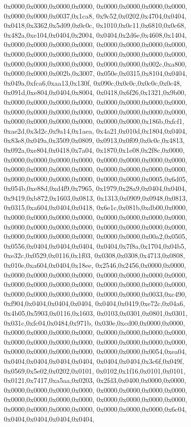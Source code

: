 {	0x0000,0x0000,0x0000,0x0000,
	0x0000,0x0000,0x0000,0x0000,
	0x0000,0x0000,0x0037,0x1ca8,
	0x9c52,0x0202,0x4704,0x0404,
	0x0418,0x3362,0x5d09,0x0c0c,
	0x1010,0x0c11,0x6810,0x0c68,
	0x482a,0xe104,0x0404,0x2004,
	0x0404,0x2d6e,0x4608,0x1404,
	0x0000,0x0000,0x0000,0x0000,
	0x0000,0x0000,0x0000,0x0000,
	0x0000,0x0000,0x0000,0x0000,
	0x0000,0x0000,0x0000,0x0000,
	0x0000,0x0000,0x0000,0x0000,
	0x0000,0x0000,0x002c,0xa800,
	0x0000,0x0000,0x002b,0x3007,
	0x050e,0x0315,0x8104,0x0404,
	0x049a,0xfca6,0xaa13,0x130f,
	0x090c,0x0c0c,0x0c0c,0x0c48,
	0x091d,0xe804,0x0404,0x8004,
	0x0418,0x6f26,0x1321,0x9b00,
	0x0000,0x0000,0x0000,0x0000,
	0x0000,0x0000,0x0000,0x0000,
	0x0000,0x0000,0x0000,0x0000,
	0x0000,0x0000,0x0000,0x0000,
	0x0000,0x0000,0x0000,0x0000,
	0x0000,0x0000,0x186b,0xfcf1,
	0xae2d,0x3d2c,0x9a14,0x1aea,
	0x4a21,0x010d,0x1804,0x0404,
	0x83e8,0x049a,0x3509,0x0809,
	0x0913,0x0f09,0x0c0c,0x4813,
	0x092a,0xe804,0x0418,0x7a04,
	0x1870,0x1e08,0x2f8c,0x0000,
	0x0000,0x0000,0x0000,0x0000,
	0x0000,0x0000,0x0000,0x0000,
	0x0000,0x0000,0x0000,0x0000,
	0x0000,0x0000,0x0000,0x0000,
	0x0000,0x0000,0x0000,0x0000,
	0x0000,0x0000,0x0005,0x6d05,
	0x054b,0xe88d,0xd4f9,0x7965,
	0x1979,0x28a9,0x0404,0x0404,
	0x9419,0xb872,0x1603,0x0813,
	0x1313,0x0909,0x0948,0x0813,
	0x0315,0xa604,0x0404,0x0418,
	0x6e1c,0x081b,0xdb00,0x0000,
	0x0000,0x0000,0x0000,0x0000,
	0x0000,0x0000,0x0000,0x0000,
	0x0000,0x0000,0x0000,0x0000,
	0x0000,0x0000,0x0000,0x0000,
	0x0000,0x0000,0x0000,0x0000,
	0x0000,0x0000,0x00a2,0x0505,
	0x0556,0x0404,0x0404,0x0404,
	0x0404,0x7f8a,0x1704,0x04b5,
	0xe32c,0x0529,0x0116,0x1f03,
	0x0308,0x0308,0x4713,0x0808,
	0x010e,0xa604,0x0404,0x18ee,
	0x2546,0x2456,0x0000,0x0000,
	0x0000,0x0000,0x0000,0x0000,
	0x0000,0x0000,0x0000,0x0000,
	0x0000,0x0000,0x0000,0x0000,
	0x0000,0x0000,0x0000,0x0000,
	0x0000,0x0000,0x0000,0x0000,
	0x0000,0x0000,0x0033,0xc490,
	0xf904,0x0404,0x0404,0x0404,
	0x0404,0x0419,0xe72c,0x04a6,
	0x4b05,0x5903,0x0116,0x1603,
	0x0103,0x0301,0x0801,0x0301,
	0x031c,0xfc04,0x0484,0x971b,
	0x030e,0xcd00,0x0000,0x0000,
	0x0000,0x0000,0x0000,0x0000,
	0x0000,0x0000,0x0000,0x0000,
	0x0000,0x0000,0x0000,0x0000,
	0x0000,0x0000,0x0000,0x0000,
	0x0000,0x0000,0x0000,0x0000,
	0x0000,0x0000,0x0054,0xea04,
	0x0404,0x0404,0x0404,0x0404,
	0x0404,0x0404,0x3c6f,0x049f,
	0x0569,0x5e02,0x0202,0x0101,
	0x0102,0x1f16,0x0101,0x0101,
	0x0121,0x7417,0xa5aa,0x0203,
	0x2fd3,0x0400,0x0000,0x0000,
	0x0000,0x0000,0x0000,0x0000,
	0x0000,0x0000,0x0000,0x0000,
	0x0000,0x0000,0x0000,0x0000,
	0x0000,0x0000,0x0000,0x0000,
	0x0000,0x0000,0x0000,0x0000,
	0x0000,0x0000,0x0000,0x6c04,
	0x0404,0x0404,0x0404,0x0404,
}
